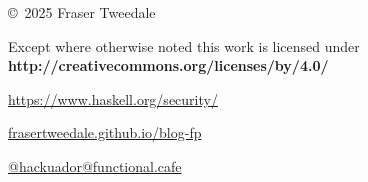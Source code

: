 \documentclass[ignorenonframetext,aspectratio=169,12pt]{beamer}
\begin{document}

\begin{frame}[plain]
\begin{columns}

  \begin{column}{.6\textwidth}

    \setlength{\parskip}{.5em}

    { \centering

    

    \copyright~2025  Fraser Tweedale

    { \scriptsize
    Except where otherwise noted this work is licensed under
    }
    { \footnotesize
    \textbf{http://creativecommons.org/licenses/by/4.0/}
    }

    }

    \begin{description}
      \small
      \item[SRT web] \url{https://www.haskell.org/security/}
      \item[My blog] \href{https://frasertweedale.github.io/blog-fp/}{frasertweedale.github.io/blog-fp}
      \item[Fediverse] \href{https://functional.cafe/@hackuador}{@hackuador@functional.cafe}
    \end{description}
  \end{column}

\end{columns}
\end{frame}
\end{document}
